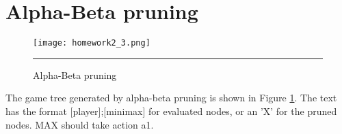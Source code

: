\documentclass[12pt]{article}
\begin{document}
\section{Alpha-Beta pruning}
\begin{figure}[htb]
  \centering
      {\texttt{[image: homework2\_3.png]}} \rule{1\linewidth}{1pt}
      \caption{Alpha-Beta pruning}
      \label{fig:abp}
\end{figure}
The game tree generated by alpha-beta pruning is shown in Figure \ref{fig:abp}. The text has the format [player];[minimax] for evaluated nodes, or an 'X' for the pruned nodes. MAX should take action a1.
\end{document}
